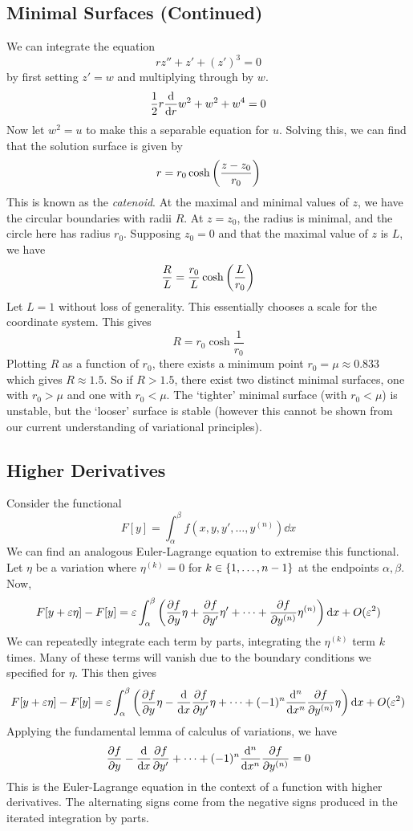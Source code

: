 \subsection{Minimal Surfaces (Continued)}
We can integrate the equation
\[
	rz'' + z' + (z')^3 = 0
\]
by first setting \( z' = w \) and multiplying through by \( w \).
\[
	\frac{1}{2}r\dv{r} w^2 + w^2 + w^4 = 0
\]
Now let \( w^2 = u \) to make this a separable equation for \( u \).
Solving this, we can find that the solution surface is given by
\[
	r = r_0 \cosh \qty(\frac{z-z_0}{r_0})
\]
This is known as the \textit{catenoid}.
At the maximal and minimal values of \( z \), we have the circular boundaries with radii \( R \).
At \( z = z_0 \), the radius is minimal, and the circle here has radius \( r_0 \).
Supposing \( z_0 = 0 \) and that the maximal value of \( z \) is \( L \), we have
\[
	\frac{R}{L} = \frac{r_0}{L} \cosh \qty(\frac{L}{r_0})
\]
Let \( L = 1 \) without loss of generality.
This essentially chooses a scale for the coordinate system.
This gives
\[
	R = r_0 \cosh \frac{1}{r_0}
\]
Plotting \( R \) as a function of \( r_0 \), there exists a minimum point \( r_0 = \mu \approx 0.833 \) which gives \( R \approx 1.5 \).
So if \( R > 1.5 \), there exist two distinct minimal surfaces, one with \( r_0 > \mu \) and one with \( r_0 < \mu \).
The `tighter' minimal surface (with \( r_0 < \mu \)) is unstable, but the `looser' surface is stable (however this cannot be shown from our current understanding of variational principles).

\subsection{Higher Derivatives}
Consider the functional
\[
	F[y] = \int_\alpha^\beta f(x,y,y',\dots,y^{(n)}) \dd{x}
\]
We can find an analogous Euler-Lagrange equation to extremise this functional.
Let \( \eta \) be a variation where \( \eta^{(k)} = 0 \) for \( k \in \qty{1, \dots, n-1} \) at the endpoints \( \alpha, \beta \).
Now,
\[
	F[y+\varepsilon \eta] - F[y] = \varepsilon\int_\alpha^\beta \qty(\pdv{f}{y} \eta + \pdv{f}{y'}\eta' + \dots + \pdv{f}{y^{(n)}}\eta^{(n)}) \dd{x} + O(\varepsilon^2)
\]
We can repeatedly integrate each term by parts, integrating the \( \eta^{(k)} \) term \( k \) times.
Many of these terms will vanish due to the boundary conditions we specified for \( \eta \).
This then gives
\[
	F[y+\varepsilon \eta] - F[y] = \varepsilon\int_\alpha^\beta \qty(\pdv{f}{y} \eta - \dv{x} \pdv{f}{y'}\eta + \dots + (-1)^n \dv[n]{x} \pdv{f}{y^{(n)}}\eta) \dd{x} + O(\varepsilon^2)
\]
Applying the fundamental lemma of calculus of variations, we have
\[
	\pdv{f}{y} - \dv{x} \pdv{f}{y'} + \dots + (-1)^n \dv[n]{x} \pdv{f}{y^{(n)}} = 0
\]
This is the Euler-Lagrange equation in the context of a function with higher derivatives.
The alternating signs come from the negative signs produced in the iterated integration by parts.

